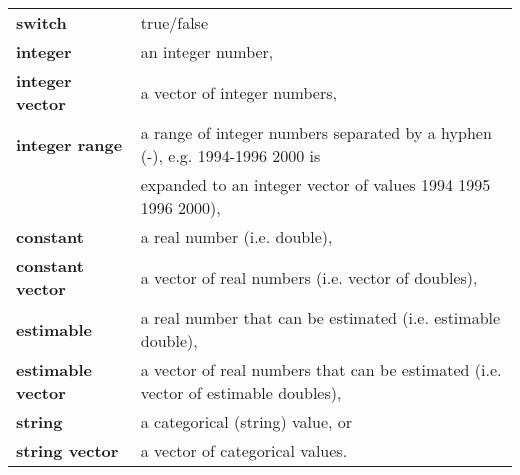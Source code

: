 
\begin{tabular}{ll}
\textbf{switch} & true/false\\ 
\textbf{integer}& an integer number,\\
\textbf{integer vector} & a vector of integer numbers,\\
\textbf{integer range} & a range of integer numbers separated by a hyphen (-), e.g. 1994-1996 2000 is \\ & expanded to an integer vector of values 1994 1995 1996 2000),\\
\textbf{constant} & a real number (i.e. double),\\
\textbf{constant vector} & a vector of real numbers (i.e. vector of doubles),\\
\textbf{estimable} & a real number that can be estimated (i.e. estimable double),\\
\textbf{estimable vector} & a vector of real numbers that can be estimated (i.e. vector of estimable doubles),\\
\textbf{string} & a categorical (string) value, or\\
\textbf{string vector} & a vector of categorical values.
\end{tabular}

